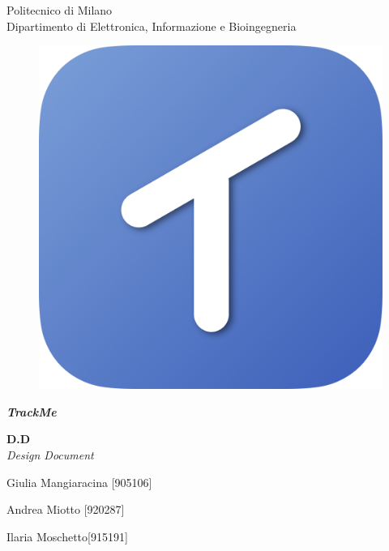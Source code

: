 \thispagestyle{empty}

\begin{center}

	\Huge Politecnico di Milano  \\   	\vspace{14pt}
    \Large Dipartimento di Elettronica, Informazione e Bioingegneria
    
    \vspace{30pt}
    
      \begin{figure}[h]
      	\centering
        \includegraphics[scale=0.25]{Pictures/Icon.png}
      \end{figure}
    
    \vspace{25pt}
    
    \Huge \textbf{\emph{TrackMe}} 
    \\
    \vspace{12pt}
    
    \huge \textbf{D.D} \\
    \vspace{7pt}
    \Large \emph{Design Document} \\
    
    \vspace{110pt}
    
    \large Giulia Mangiaracina [905106]\\
    
    \vspace{5pt}
    
    \large Andrea Miotto [920287]\\
    
    \vspace{5pt}
    
    \large Ilaria Moschetto[915191]
    
\end{center}